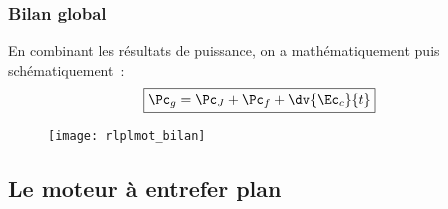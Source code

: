 \documentclass[../main/main.tex]{subfiles}
\begin{document}
\subsubsection{Bilan global}
\label{sssec:rlplmot_bilanglb}
En combinant les résultats de puissance, on a mathématiquement puis
schématiquement~:
\[
  \boxed{\Pc_g = \Pc_J + \Pc_f + \dv{\Ec_c}{t}}
\]
\begin{figure}[h!]
  \centering
  \texttt{[image: rlplmot\_bilan]}
  \label{fig:rlplmot_bilan}
\end{figure}

\newpage

\subsection{Le moteur à entrefer plan}
\label{ssec:motentrefer}
\end{document}
